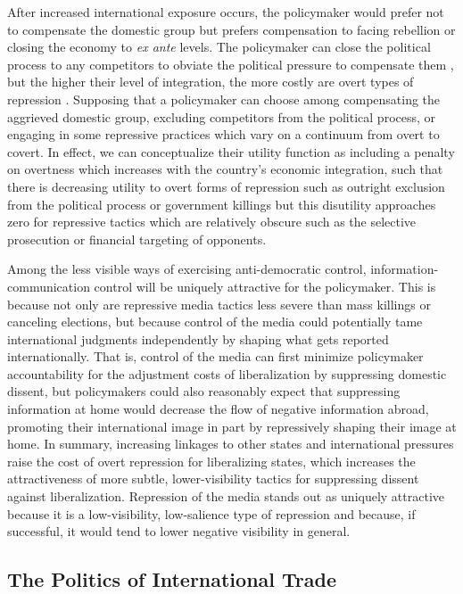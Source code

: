 \documentclass[12pt,a4paper]{article}
\begin{document}
After increased international exposure occurs, the policymaker would prefer not to compensate the domestic group but prefers compensation to facing rebellion or closing the economy to \emph{ex ante} levels. The policymaker can close the political process to any competitors to obviate the political pressure to compensate them \parencite{Adsera:2002vt}, but the higher their level of integration, the more costly are overt types of repression \parencite{Levitsky:2002gx}. Supposing that a policymaker can choose among compensating the aggrieved domestic group, excluding competitors from the political process, or engaging in some repressive practices which vary on a continuum from overt to covert. In effect, we can conceptualize their utility function as including a penalty on overtness which increases with the country's economic integration, such that there is decreasing utility to overt forms of repression such as outright exclusion from the political process or government killings but this disutility approaches zero for repressive tactics which are relatively obscure such as the selective prosecution or financial targeting of opponents.

Among the less visible ways of exercising anti-democratic control, information-communication control will be uniquely attractive for the policymaker. This is because not only are repressive media tactics less severe than mass killings or canceling elections, but because control of the media could potentially tame international judgments independently by shaping what gets reported internationally. That is, control of the media can first minimize policymaker accountability for the adjustment costs of liberalization by suppressing domestic dissent, but policymakers could also reasonably expect that suppressing information at home would decrease the flow of negative information abroad, promoting their international image in part by repressively shaping their image at home. In summary, increasing linkages to other states and international pressures raise the cost of overt repression for liberalizing states, which increases the attractiveness of more subtle, lower-visibility tactics for suppressing dissent against liberalization. Repression of the media stands out as uniquely attractive because it is a low-visibility, low-salience type of repression and because, if successful, it would tend to lower negative visibility in general.

\subsection{The Politics of International Trade}
\end{document}
